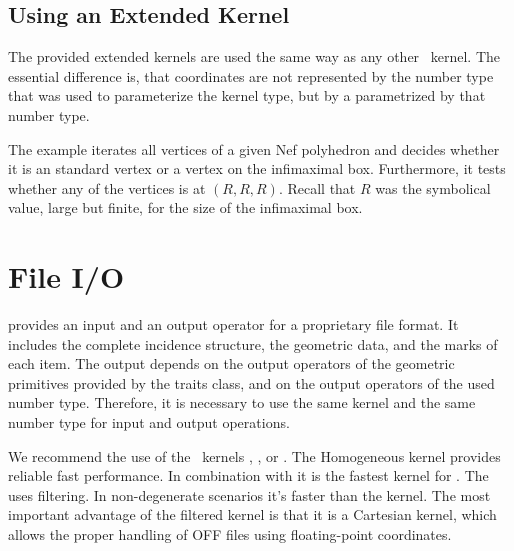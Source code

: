 \subsection{Using an Extended Kernel}

The provided extended kernels are used the same way as any other
\cgal\ kernel.  The essential difference is, that coordinates are not
represented by the number type that was used to parameterize the
kernel type, but by a  parametrized by that number
type.

The example iterates all vertices of a given Nef polyhedron and decides whether
it is an standard vertex or a vertex on the infimaximal box. Furthermore, it 
tests whether any of the vertices is at $(R,R,R)$. Recall that $R$ was
the symbolical value, large but finite, for the size of the infimaximal box. 


\section{File I/O}
\label{sectionNef_3IO}

 provides an input and an output operator for a
proprietary file format. It includes the complete incidence structure,
the geometric data, and the marks of each item.  The output depends on
the output operators of the geometric primitives provided by the
traits class, and on the output operators of the used number type.
Therefore, it is necessary to use the same kernel and the same number
type for input and output operations.

We recommend the use of the \cgal\ kernels , 
, or .
The Homogeneous kernel provides reliable fast performance. In combination with
 it is the fastest kernel for . The
 uses filtering. In non-degenerate
scenarios it's faster than the  kernel. The most
important advantage of the filtered kernel is that it is a Cartesian
kernel, which allows the proper handling of OFF files using
floating-point coordinates. 

